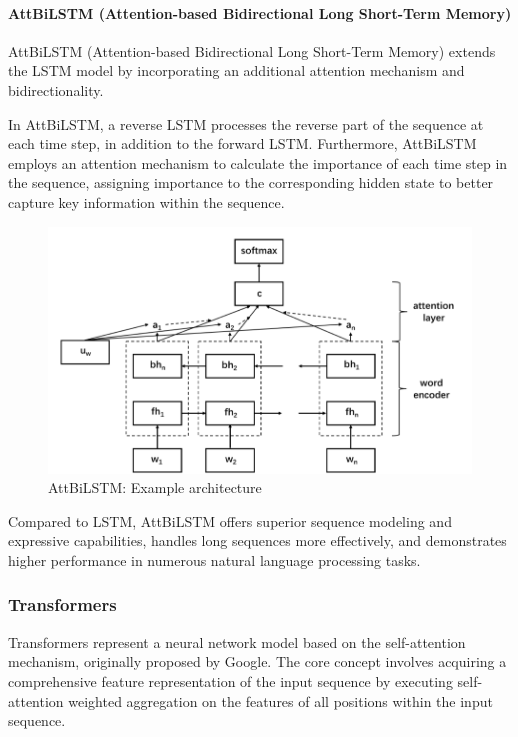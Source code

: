 \documentclass[a4paper]{article}
\begin{document}
\paragraph{AttBiLSTM (Attention-based Bidirectional Long Short-Term Memory)}

AttBiLSTM (Attention-based Bidirectional Long Short-Term Memory) extends the LSTM model by incorporating an additional attention mechanism and bidirectionality.

In AttBiLSTM, a reverse LSTM processes the reverse part of the sequence at each time step, in addition to the forward LSTM. Furthermore, AttBiLSTM employs an attention mechanism to calculate the importance of each time step in the sequence, assigning importance to the corresponding hidden state to better capture key information within the sequence.

\begin{figure}[H]
	\centering
	\includegraphics[width=1\textwidth]{./images/AttBiLSTM_architecture.png}
	\caption{AttBiLSTM: Example architecture}
	\label{fig.AttBiLSTM[HEMOS: A novel deep learning-based fine-grained humor detecting method for sentiment analysis of social media]}
\end{figure}

Compared to LSTM, AttBiLSTM offers superior sequence modeling and expressive capabilities, handles long sequences more effectively, and demonstrates higher performance in numerous natural language processing tasks.

\subsubsection{Transformers}

Transformers represent a neural network model based on the self-attention mechanism, originally proposed by Google. The core concept involves acquiring a comprehensive feature representation of the input sequence by executing self-attention weighted aggregation on the features of all positions within the input sequence.
\end{document}
